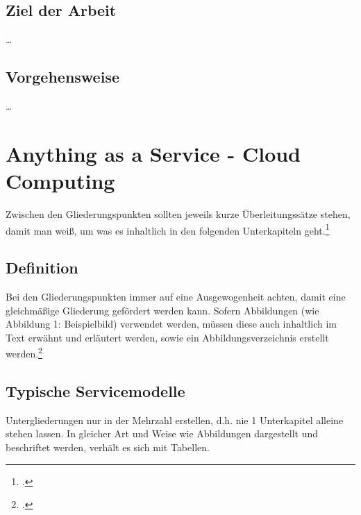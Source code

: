 \documentclass[12pt,toc=bib,toc=listof]{scrreprt}
\begin{document}

\section{Ziel der Arbeit} %
\label{sec:ziel_der_arbeit}

\ldots


\section{Vorgehensweise} %
\label{sec:vorgehensweise}

\ldots


\chapter{Anything as a Service - Cloud Computing} %
\label{sec:Anything as a Service - Cloud Computing}

Zwischen den Gliederungspunkten sollten jeweils kurze Überleitungssätze stehen, damit man weiß, um was es inhaltlich in den folgenden Unterkapiteln geht.\footcite [Vgl.] []{GPL}


\section{Definition} %
\label{sec:Definition}

Bei den Gliederungspunkten immer auf eine Ausgewogenheit achten, damit eine gleichmäßige Gliederung gefördert werden kann. Sofern Abbildungen (wie Abbildung 1: Beispielbild) verwendet werden, müssen diese auch inhaltlich im Text erwähnt und erläutert werden, sowie ein Abbildungsverzeichnis erstellt werden.\footcite [Vgl.] [] {hhnwin}


\section{Typische Servicemodelle} %
\label{sec:Typische Servicemodelle}

Untergliederungen nur in der Mehrzahl erstellen, d.h. nie 1 Unterkapitel alleine stehen lassen.
In gleicher Art und Weise wie Abbildungen dargestellt und beschriftet werden, verhält es sich mit Tabellen.
\end{document}
